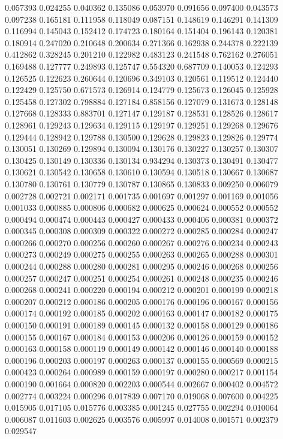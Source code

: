 0.057393
0.024255
0.040362
0.135086
0.053970
0.091656
0.097400
0.043573
0.097238
0.165181
0.111958
0.118049
0.087151
0.148619
0.146291
0.141309
0.116994
0.145043
0.152412
0.174723
0.180164
0.151404
0.196143
0.120381
0.180914
0.247020
0.210648
0.200634
0.271366
0.162938
0.244378
0.222139
0.412862
0.328245
0.201210
0.122982
0.483123
0.241548
0.762162
0.276051
0.169488
0.127777
0.249893
0.125747
0.554320
0.687709
0.140053
0.124293
0.126525
0.122623
0.260644
0.120696
0.349103
0.120561
0.119512
0.124440
0.122429
0.125750
0.671573
0.126914
0.124779
0.125673
0.126045
0.125928
0.125458
0.127302
0.798884
0.127184
0.858156
0.127079
0.131673
0.128148
0.127668
0.128333
0.883701
0.127147
0.129187
0.128531
0.128526
0.128617
0.128961
0.129243
0.129634
0.129115
0.129197
0.129251
0.129268
0.129676
0.129444
0.128942
0.129788
0.130500
0.129628
0.129823
0.129826
0.129774
0.130051
0.130269
0.129894
0.130094
0.130176
0.130227
0.130257
0.130307
0.130425
0.130149
0.130336
0.130134
0.934294
0.130373
0.130491
0.130477
0.130621
0.130542
0.130658
0.130610
0.130594
0.130518
0.130667
0.130687
0.130780
0.130761
0.130779
0.130787
0.130865
0.130833
0.009250
0.006079
0.002728
0.002721
0.002171
0.001735
0.001697
0.001297
0.001169
0.001056
0.001033
0.000885
0.000806
0.000682
0.000625
0.000624
0.000552
0.000552
0.000494
0.000474
0.000443
0.000427
0.000433
0.000406
0.000381
0.000372
0.000345
0.000308
0.000309
0.000322
0.000272
0.000285
0.000284
0.000247
0.000266
0.000270
0.000256
0.000260
0.000267
0.000276
0.000234
0.000243
0.000273
0.000249
0.000275
0.000255
0.000263
0.000265
0.000288
0.000301
0.000244
0.000288
0.000280
0.000281
0.000295
0.000246
0.000268
0.000256
0.000257
0.000247
0.000251
0.000254
0.000261
0.000248
0.000235
0.000246
0.000268
0.000241
0.000220
0.000194
0.000212
0.000201
0.000199
0.000218
0.000207
0.000212
0.000186
0.000205
0.000176
0.000196
0.000167
0.000156
0.000174
0.000192
0.000185
0.000202
0.000163
0.000147
0.000182
0.000175
0.000150
0.000191
0.000189
0.000145
0.000132
0.000158
0.000129
0.000186
0.000155
0.000167
0.000184
0.000153
0.000206
0.000126
0.000159
0.000152
0.000163
0.000158
0.000119
0.000149
0.000142
0.000146
0.000140
0.000188
0.000196
0.000203
0.000197
0.000263
0.000137
0.000155
0.000569
0.000215
0.000423
0.000264
0.000989
0.000159
0.000197
0.000280
0.000217
0.001154
0.000190
0.001664
0.000820
0.002203
0.000544
0.002667
0.000402
0.004572
0.002774
0.003224
0.000296
0.017839
0.007170
0.019068
0.007600
0.004225
0.015905
0.017105
0.015776
0.003385
0.001245
0.027755
0.002294
0.010064
0.006087
0.011603
0.002625
0.003576
0.005997
0.014008
0.001571
0.002379
0.029547
